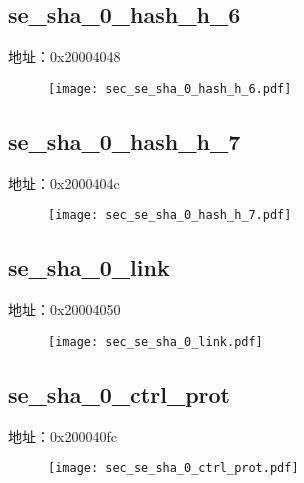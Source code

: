 \subsection{se\_sha\_0\_hash\_h\_6}
\label{sec-se-sha-0-hash-h-6}
地址：0x20004048
 \begin{figure}[H]
\texttt{[image: sec\_se\_sha\_0\_hash\_h\_6.pdf]}
\end{figure}

\subsection{se\_sha\_0\_hash\_h\_7}
\label{sec-se-sha-0-hash-h-7}
地址：0x2000404c
 \begin{figure}[H]
\texttt{[image: sec\_se\_sha\_0\_hash\_h\_7.pdf]}
\end{figure}

\subsection{se\_sha\_0\_link}
\label{sec-se-sha-0-link}
地址：0x20004050
 \begin{figure}[H]
\texttt{[image: sec\_se\_sha\_0\_link.pdf]}
\end{figure}

\subsection{se\_sha\_0\_ctrl\_prot}
\label{sec-se-sha-0-ctrl-prot}
地址：0x200040fc
 \begin{figure}[H]
\texttt{[image: sec\_se\_sha\_0\_ctrl\_prot.pdf]}
\end{figure}

